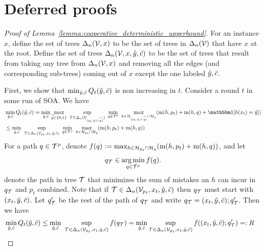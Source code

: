\documentclass[11pt,letterpaper]{article}
\theoremstyle{definition}
\theoremstyle{plain}
\DeclareMathOperator*{\argmin}{arg\,min}
\begin{document}
\section{Deferred proofs}

\begin{proof}[Proof of Lemma~\ref{lemma:cooperative_deterministic_upperbound}]
For an instance $x$, define the set of trees $\Delta_n({\mathcal V},x)$ to be the set of trees in $\Delta_n({\mathcal V})$ that have $x$ at the root.
Define the set of trees $\Delta_n({\mathcal V},x,{\hat{y}},\bar{c})$ to be the set of trees that result from taking any tree from $\Delta_n({\mathcal V},x)$ and removing all the edges (and corresponding sub-trees) coming out of $x$ except the one labeled ${\hat{y}},\bar{c}$. 

First, we show that $\min_{{\hat{y}},\bar{c}}Q_t({\hat{y}},\bar{c})$ is non increasing in $t$. Consider a round $t$ in some run of SOA. We have
\begin{align*}
  &\min_{\hy,\sc}Q_t(\hy,\sc) = \min_{\hy,\sc} \max_{\vy\in\{0,1\}} ~\sup_{\T\in\Delta_n(\V_{(p_t,\hy, \sc, \vy)})} ~\min_{q\in\T^\rho} ~\max_{h\in \H_{(p_t,\hy, \sc, \vy)}\cap \H_q} (\mi(h, p_t) + \mi(h,q)+\indct[h(x_t) = \hy])\\
  &\leq
    \min_{\hy,\sc}  ~\sup_{\T\in\Delta_n(\V_{p_t},x_t,\hy,\sc)} ~\min_{q\in\T^\rho} ~\max_{h\in \H_{p_t}\cap \H_q} (\mi(h, p_t) + \mi(h,q))
\end{align*}
For a path $q\in{\mathcal T}^\rho$, denote $f(q) := \max_{h\in {{\mathcal H}}_{p_t}\cap {{\mathcal H}}_q} (\mathrm{m}(h, p_t) + \mathrm{m}(h,q))$, and let
\[
q_\T \in \argmin_{q\in\T^\rho} f(q).
\]
denote the path in tree ${\mathcal T}$ that minimizes the sum of mistakes an $h$ can incur in $q_{\mathcal T}$ and $p_t$ combined.
Note that if ${\mathcal T} \in \Delta_n({\mathcal V}_{p_t},x_t,{\hat{y}},\bar{c})$ then $q_{\mathcal T}$ must start with $(x_t,{\hat{y}},\bar{c})$. Let $q'_{\mathcal T}$ be the rest of the path of $q_{\mathcal T}$ and write $q_{\mathcal T} = (x_t,{\hat{y}},\bar{c});q'_{\mathcal T}$. 
Then we have 
\begin{align*}
&\min_{{\hat{y}},\bar{c}}Q_t({\hat{y}},\bar{c})  \leq \min_{{\hat{y}},\bar{c}}  ~\sup_{{\mathcal T}\in\Delta_n({\mathcal V}_{p_t},x_t,{\hat{y}},\bar{c})} f(q_{\mathcal T}) = 
\min_{{\hat{y}},\bar{c}}\sup_{{\mathcal T}\in\Delta_n({\mathcal V}_{p_t},x_t,{\hat{y}},\bar{c})} f((x_t,{\hat{y}},\bar{c});q'_{\mathcal T}) =: R
\end{align*}


\end{proof}
\end{document}
